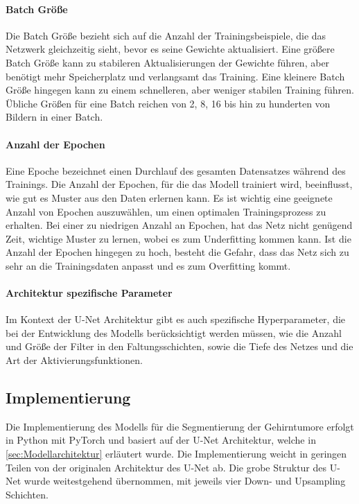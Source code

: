 \paragraph{Batch Größe} Die Batch Größe bezieht sich auf die Anzahl der Trainingsbeispiele, die das Netzwerk gleichzeitig sieht, bevor es seine Gewichte aktualisiert. Eine größere Batch Größe kann zu stabileren Aktualisierungen der Gewichte führen, aber benötigt mehr Speicherplatz und verlangsamt das Training. Eine kleinere Batch Größe hingegen kann zu einem schnelleren, aber weniger stabilen Training führen. Übliche Größen für eine Batch reichen von 2, 8, 16 bis hin zu hunderten von Bildern in einer Batch. \cite[vgl.][]{Yu2020}

\paragraph{Anzahl der Epochen} Eine Epoche bezeichnet einen Durchlauf des gesamten Datensatzes während des Trainings. Die Anzahl der Epochen, für die das \gls{Modell} trainiert wird, beeinflusst, wie gut es Muster aus den Daten erlernen kann. Es ist wichtig eine geeignete Anzahl von Epochen auszuwählen, um einen optimalen Trainingsprozess zu erhalten. Bei einer zu niedrigen Anzahl an Epochen, hat das Netz nicht genügend Zeit, wichtige Muster zu lernen, wobei es zum Underfitting kommen kann. Ist die Anzahl der Epochen hingegen zu hoch, besteht die Gefahr, dass das Netz sich zu sehr an die Trainingsdaten anpasst und es zum Overfitting kommt. \cite[vgl.][]{Goodfellow2016}

\paragraph{Architektur spezifische Parameter} Im Kontext der U-Net Architektur gibt es auch spezifische Hyperparameter, die bei der Entwicklung des \glspl{Modell} berücksichtigt werden müssen, wie die Anzahl und Größe der Filter in den Faltungsschichten, sowie die Tiefe des Netzes und die Art der Aktivierungsfunktionen.


\subsection{Implementierung}
\label{subsec:Implementierung}
Die Implementierung des \gls{Modell}s für die Segmentierung der Gehirntumore erfolgt in Python mit PyTorch und basiert auf der U-Net Architektur, welche in \ref{sec:Modellarchitektur} erläutert wurde. Die Implementierung weicht in geringen Teilen von der originalen Architektur des U-Net ab. Die grobe Struktur des U-Net wurde weitestgehend übernommen, mit jeweils vier Down- und Upsampling Schichten. 

